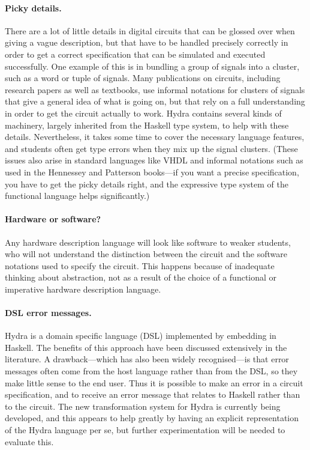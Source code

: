 \documentclass[submission,copyright,creativecommons]{eptcs}
\begin{document}
\paragraph{Picky details.}
There are a lot of little details in digital circuits that can be
glossed over when giving a vague description, but that have to be
handled precisely correctly in order to get a correct specification
that can be simulated and executed successfully.  One example of
this is in bundling a group of signals into a cluster, such as a
word or tuple of signals.  Many publications on circuits, including
research papers as well as textbooks, use informal notations for
clusters of signals that give a general idea of what is going on,
but that rely on a full understanding in order to get the circuit
actually to work.  Hydra contains several kinds of machinery,
largely inherited from the Haskell type system, to help with these
details.  Nevertheless, it takes some time to cover the necessary
language features, and students often get type errors when they mix
up the signal clusters.  (These issues also arise in standard
languages like VHDL and informal notations such as used in the
Hennessey and Patterson books---if you want a precise
specification, you have to get the picky details right, and the
expressive type system of the functional language helps
significantly.)

\paragraph{Hardware or software?}
Any hardware description language will look like software to weaker
students, who will not understand the distinction between the
circuit and the software notations used to specify the circuit.
This happens because of inadequate thinking about abstraction, not
as a result of the choice of a functional or imperative hardware
description language.

\paragraph{DSL error messages.}
Hydra is a domain specific language (DSL) implemented by embedding in
Haskell.  The benefits of this approach have been discussed
extensively in the literature.  A drawback---which has also been
widely recognised---is that error messages often come from the host
language rather than from the DSL, so they make little sense to the
end user.  Thus it is possible to make an error in a circuit
specification, and to receive an error message that relates to Haskell
rather than to the circuit.  The new transformation system for Hydra
is currently being developed, and this appears to help greatly by
having an explicit representation of the Hydra language per se, but
further experimentation will be needed to evaluate this.
\end{document}
